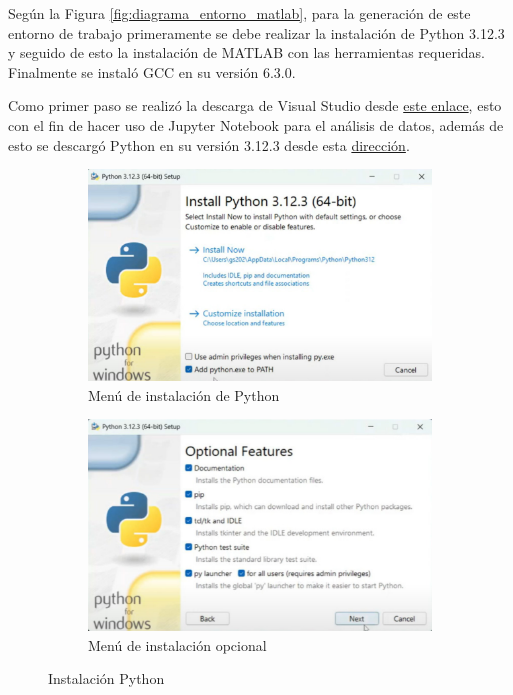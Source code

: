 Según la Figura \ref{fig:diagrama_entorno_matlab}, para la generación de este entorno de trabajo primeramente se debe realizar la instalación de Python 3.12.3 y seguido de esto la instalación de MATLAB con las herramientas requeridas. Finalmente se instaló GCC en su versión 6.3.0.

Como primer paso se realizó la descarga de Visual Studio desde \href{https://code.visualstudio.com/sha/download?build=stable&os=win32-x64-user}{este enlace}, esto con el fin de hacer uso de Jupyter Notebook para el análisis de datos, además de esto se descargó Python en su versión 3.12.3 desde esta \href{https://www.python.org/ftp/python/3.12.3/python-3.12.3-amd64.exe}{dirección}. 


\begin{figure}[htbp]
    \centering
    \begin{subfigure}[b]{0.45\textwidth}
        \centering
        \includegraphics[width=\textwidth]{fig/especifico_2/Ambiente_matlab/instalacion_python.pdf}
        \caption{Menú de instalación de Python}
        \label{fig:menu_python}
    \end{subfigure}
    \hfill
    \begin{subfigure}[b]{0.45\textwidth}
        \centering
        \includegraphics[width=\textwidth]{fig/especifico_2/Ambiente_matlab/opciones_adicionales_python.pdf}
        \caption{Menú de instalación opcional}
        \label{fig:menu_python_adicionales}
    \end{subfigure}
    \caption{Instalación Python}
    \label{fig:menu_python_adicionales_2}
\end{figure}


